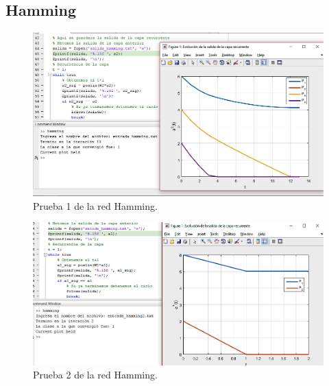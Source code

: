 \documentclass[12pt, titlepage]{article}
\begin{document}
        \subsection{Hamming}
            \begin{figure}[H]
                \begin{center}
                    \includegraphics[width=16cm]{img/hamming1.png}
                    \caption{Prueba 1 de la red Hamming.}
                    \label{fig:hamming1}
                \end{center}
            \end{figure}
        
            \begin{figure}[H]
                \begin{center}
                    \includegraphics[width=16cm]{img/hamming2.png}
                    \caption{Prueba 2 de la red Hamming.}
                    \label{fig:hamming2}
                \end{center}
            \end{figure}
        
\end{document}
